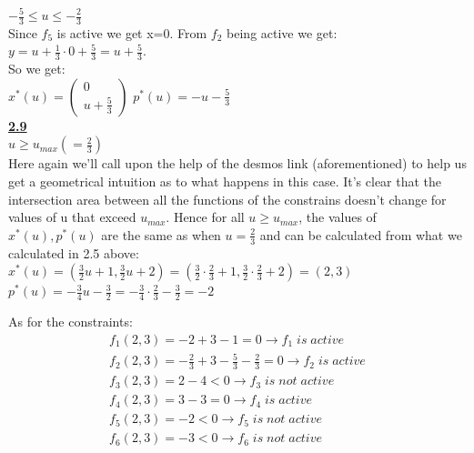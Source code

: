\documentclass[fleqn]{article}
\begin{document}
\underline{$-\frac{5}{3} \leq u \leq -\frac{2}{3}$} \\
Since $f_5$ is active we get x=0. From $f_2$ being active we get: $y = u+\frac{1}{3}\cdot 0 +\frac{5}{3} = u +\frac{5}{3}$.\\
So we get: \\

$\boxed{x^*(u) = \begin{pmatrix}
           0 \\
           u +\frac{5}{3} 
         \end{pmatrix}}$
$\boxed{p^*(u) = -u -\frac{5}{3}}$ \\

\underline{\textbf{2.9}} \\

\underline{$u \geq u_{max} (=\frac{2}{3})$} \\

Here again we'll call upon the help of the desmos link (aforementioned) to help us get a geometrical intuition as to what happens in this case. It's clear that the intersection area between all the functions of the constrains doesn't change for values of u that exceed $u_{max}$. Hence for all $u \geq u_{max}$, the values of $x^*(u), p^*(u)$ are the same as when $u=\frac{2}{3}$ and can be calculated from what we calculated in 2.5 above:\\
$x^*(u) = (\frac{3}{2}u+1, \frac{3}{2}u+2) = (\frac{3}{2} \cdot \frac{2}{3}+1, \frac{3}{2}\cdot \frac{2}{3}+2) = (2,3)$ \\

$p^*(u) = -\frac{3}{4}u-\frac{3}{2} = -\frac{3}{4}\cdot \frac{2}{3}-\frac{3}{2} = -2$

As for the constraints: \\

\begin{multline*}
f_1(2,3) = -2+3-1 = 0 \rightarrow \boxed{f_1 \; is \; active} \\
f_2(2,3) = -\frac{2}{3}+3-\frac{5}{3}-\frac{2}{3} = 0 \rightarrow \boxed{f_2 \; is  \; active} \\
f_3(2,3) = 2-4<0 \rightarrow \boxed{f_3 \; is \; not  \; active} \\
f_4(2,3) = 3-3=0 \rightarrow \boxed{f_4 \; is \; active} \\
f_5(2,3) = -2<0 \rightarrow \boxed{f_5 \; is \; not \; active} \\
f_6(2,3) = -3<0 \rightarrow \boxed{f_6 \; is \; not \; active} \\
\end{multline*} \\
\end{document}
